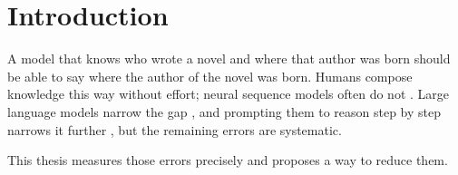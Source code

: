 \chapter{Introduction}
\label{ch:introduction}

A model that knows who wrote a novel and where that author was born should be able to say
where the author of the novel was born. Humans compose knowledge this way without effort;
neural sequence models often do not \citep{lake2018, keysers2020}. Large language models
narrow the gap \citep{brown2020}, and prompting them to reason step by step narrows it further
\citep{wei2022}, but the remaining errors are systematic.

This thesis measures those errors precisely and proposes a way to reduce them.

